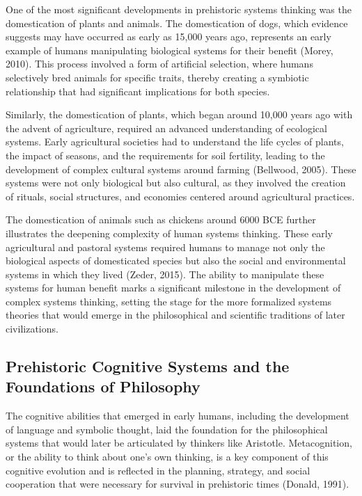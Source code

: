 \documentclass[twocolumn]{article}
\begin{document}
\textcolor{primary}{One of the most significant developments in prehistoric systems thinking was the domestication of plants and animals. The domestication of dogs, which evidence suggests may have occurred as early as 15,000 years ago, represents an early example of humans manipulating biological systems for their benefit (Morey, 2010). This process involved a form of artificial selection, where humans selectively bred animals for specific traits, thereby creating a symbiotic relationship that had significant implications for both species.}

\textcolor{secondary}{Similarly, the domestication of plants, which began around 10,000 years ago with the advent of agriculture, required an advanced understanding of ecological systems. Early agricultural societies had to understand the life cycles of plants, the impact of seasons, and the requirements for soil fertility, leading to the development of complex cultural systems around farming (Bellwood, 2005). These systems were not only biological but also cultural, as they involved the creation of rituals, social structures, and economies centered around agricultural practices.}

\textcolor{primary}{The domestication of animals such as chickens around 6000 BCE further illustrates the deepening complexity of human systems thinking. These early agricultural and pastoral systems required humans to manage not only the biological aspects of domesticated species but also the social and environmental systems in which they lived (Zeder, 2015). The ability to manipulate these systems for human benefit marks a significant milestone in the development of complex systems thinking, setting the stage for the more formalized systems theories that would emerge in the philosophical and scientific traditions of later civilizations.}


\subsection{Prehistoric Cognitive Systems and the Foundations of Philosophy}

\textcolor{primary}{The cognitive abilities that emerged in early humans, including the development of language and symbolic thought, laid the foundation for the philosophical systems that would later be articulated by thinkers like Aristotle. Metacognition, or the ability to think about one's own thinking, is a key component of this cognitive evolution and is reflected in the planning, strategy, and social cooperation that were necessary for survival in prehistoric times (Donald, 1991).}
\end{document}
